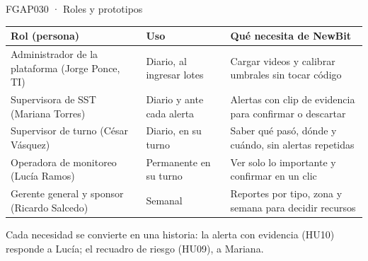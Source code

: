 \documentclass[aspectratio=169,11pt]{beamer}
\begin{document}
\begin{frame}{FGAP030 · Roles y prototipos}
\footnotesize
\begin{tabularx}{\textwidth}{>{\raggedright\arraybackslash}p{4.3cm} >{\raggedright\arraybackslash}p{2.6cm} L}
\toprule
Rol (persona) & Uso & Qué necesita de NewBit\\
\midrule
Administrador de la plataforma (Jorge Ponce, TI) & Diario, al ingresar lotes & Cargar videos y calibrar umbrales sin tocar código\\
Supervisora de SST (Mariana Torres) & Diario y ante cada alerta & Alertas con clip de evidencia para confirmar o descartar\\
Supervisor de turno (César Vásquez) & Diario, en su turno & Saber qué pasó, dónde y cuándo, sin alertas repetidas\\
Operadora de monitoreo (Lucía Ramos) & Permanente en su turno & Ver solo lo importante y confirmar en un clic\\
Gerente general y sponsor (Ricardo Salcedo) & Semanal & Reportes por tipo, zona y semana para decidir recursos\\
\bottomrule
\end{tabularx}
\vspace{0.4cm}

\small Cada necesidad se convierte en una historia: la alerta con evidencia (HU10) responde a Lucía; el recuadro de riesgo (HU09), a Mariana.
\end{frame}
\end{document}
